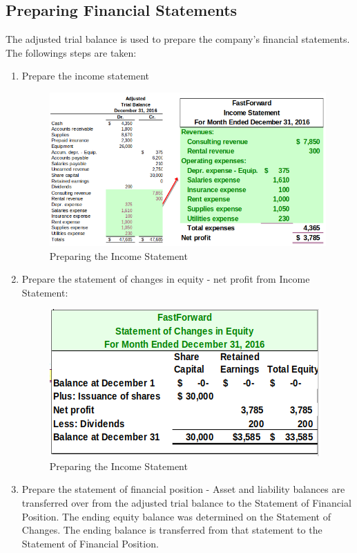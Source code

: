 \documentclass[../main.tex]{subfiles}
\begin{document}
	
	\subsection{Preparing Financial Statements}
	
	The adjusted trial balance is used to prepare the company's financial 
	statements. The followings steps are taken:
	\begin{enumerate}[noitemsep]
		\item Prepare the income statement
		\begin{figure}[ht]
			\centering
			\includegraphics[width=\columnwidth]{images/c4/preparing_income_statement.png}
			\caption{Preparing the Income Statement}
		\end{figure}
		\item Prepare the statement of changes in equity - net profit from 
		Income Statement:
		\begin{figure}[ht!]
			\centering
			\includegraphics[width=0.8\columnwidth]{images/c4/statement_of_sce.png}
			\caption{Preparing the Income Statement}
		\end{figure}
		\item Prepare the statement of financial position - Asset and 
		liability balances are transferred over from the adjusted trial balance 
		to the Statement of Financial Position. The ending equity balance was 
		determined on the Statement of Changes. The ending balance is 
		transferred from that statement to the Statement of Financial Position. 
		

\end{enumerate}
\end{document}

